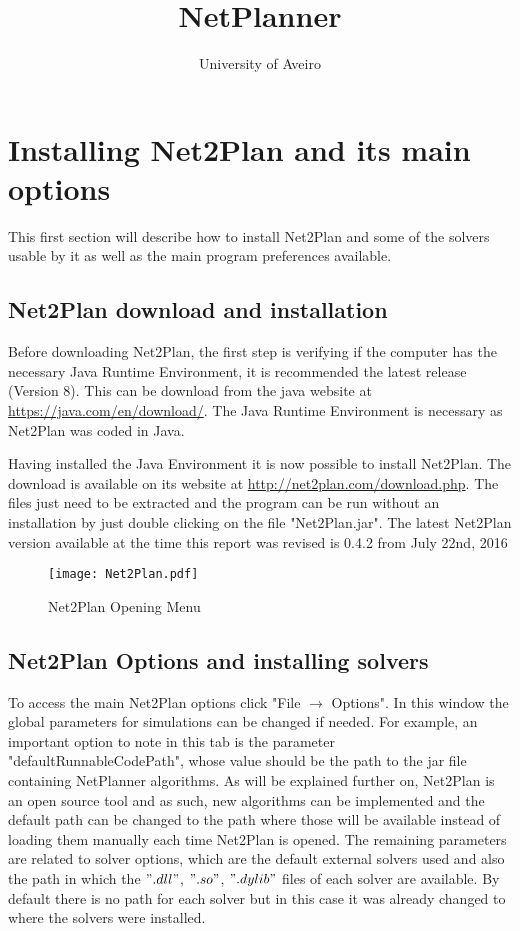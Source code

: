 \documentclass[12pt, a4paper]{article}
\begin{document}
\title{NetPlanner}
\author{University of Aveiro}
\maketitle

\tableofcontents
\clearpage
\newpage
\thispagestyle{empty}
\mbox{}
\pagebreak


\clearpage
\section{Installing Net2Plan and its main options}
This first section will describe how to install Net2Plan and some of the solvers usable by it as well as the main program preferences available.


    \subsection{Net2Plan download and installation}
    \vspace{0.5cm}
	Before downloading Net2Plan, the first step is verifying if the computer has the necessary Java Runtime Environment, it is recommended the latest release (Version 8). This can be download from the java website at \url{https://java.com/en/download/}. The Java Runtime Environment is necessary as Net2Plan was coded in Java.
		
    Having installed the Java Environment it is now possible to install Net2Plan. The download is available on its website at \url{http://net2plan.com/download.php}. The files just need to be extracted and the program can be run without an installation by just double clicking on the file "Net2Plan.jar". The latest Net2Plan version available at the time this report was revised is 0.4.2 from July 22nd, 2016

    \begin{figure}[h!]
       	\centering
       	\texttt{[image: Net2Plan.pdf]}
       	\caption{Net2Plan Opening Menu}
    \end{figure}

	\subsection{Net2Plan Options and installing solvers}
	\vspace{0.5cm}
	To access the main Net2Plan options click "File $\rightarrow$ Options". In this window the global parameters for simulations can be changed if needed.
	For example, an important option to note in this tab is the parameter "defaultRunnableCodePath", whose value should be the path to the jar file containing NetPlanner algorithms. As will be explained further on, Net2Plan is an open source tool and as such, new algorithms can be implemented and the default path can be changed to the path where those will be available instead of loading them manually each time Net2Plan is opened.	The remaining parameters are related to solver options, which are the default external solvers used and also the path in which the $".dll"$, $".so"$, $".dylib"$ files of each solver are available. By default there is no path for each solver but in this case it was already changed to where the solvers were installed.
	\pagebreak
	
\end{document}
